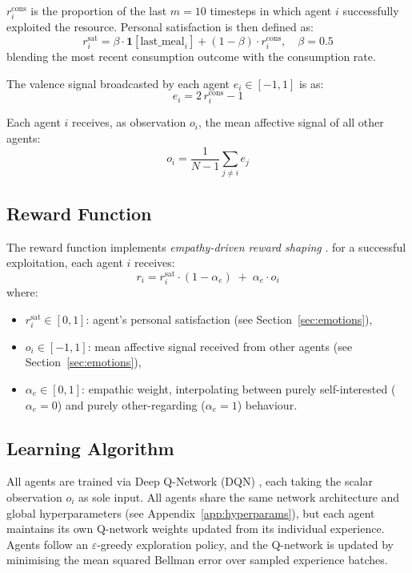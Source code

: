 $r_i^{\text{cons}}$ is the proportion of the last $m = 10$
timesteps in which agent $i$ successfully exploited the resource. Personal satisfaction is
then defined as:
\begin{equation}
    r_i^{\text{sat}} = \beta \cdot \mathbf{1}[\text{last\_meal}_i]
                     + (1 - \beta) \cdot r_i^{\text{cons}}, \quad \beta = 0.5
\end{equation}
blending the most recent consumption outcome with the consumption rate.

The valence signal broadcasted by each agent $e_i \in [-1, 1]$ is as:
\begin{equation}
    e_i = 2\,r_i^{\text{cons}} - 1
\end{equation}

Each agent $i$ receives, as observation $o_i$, the mean affective signal
of all other agents:
\begin{equation}
    o_i = \frac{1}{N-1}\sum_{j \neq i} e_j
\end{equation}
 
\subsection{Reward Function}
\label{sec:reward}
 
The reward function implements \emph{empathy-driven reward shaping}
\cite{lynne2016}. for a successful exploitation, each agent $i$ receives:
\begin{equation}
    r_i = r_i^{\text{sat}} \cdot (1 - \alpha_e) \;+\; \alpha_e \cdot o_i
\end{equation}
where:
\begin{itemize}
    \item $r_i^{\text{sat}} \in [0, 1]$: agent's personal satisfaction
          (see Section~\ref{sec:emotions}),
    \item $o_i \in [-1, 1]$: mean affective signal received from other agents
          (see Section~\ref{sec:emotions}),
    \item $\alpha_e \in [0, 1]$: empathic weight, interpolating between
          purely self-interested ($\alpha_e = 0$) and purely
          other-regarding ($\alpha_e = 1$) behaviour.
\end{itemize}
 
\subsection{Learning Algorithm}

All agents are trained via Deep Q-Network (DQN) \cite{mnih2015}, each taking the scalar observation $o_i$ as sole input. All agents share the same network architecture and global hyperparameters (see Appendix~\ref{app:hyperparams}), but each agent maintains its own Q-network weights updated from its individual experience. Agents follow an $\varepsilon$-greedy exploration policy, and the Q-network is updated by minimising the mean squared Bellman error over sampled experience batches.

